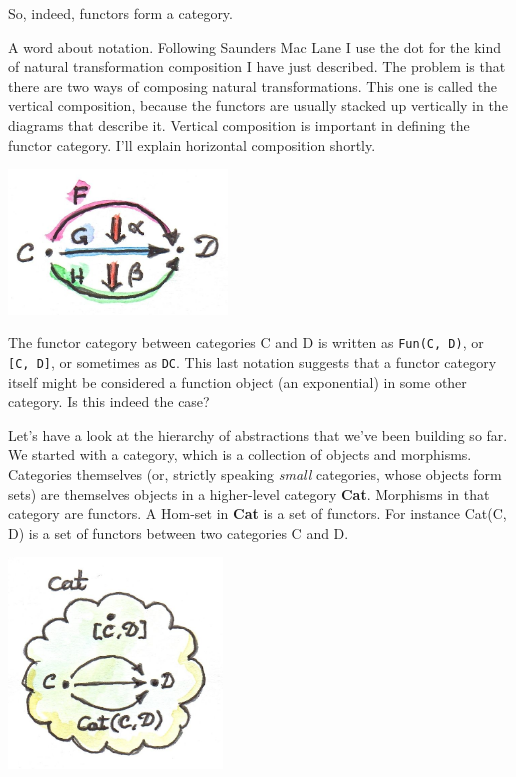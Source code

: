 So, indeed, functors form a category.

A word about notation. Following Saunders Mac Lane I use the dot for the
kind of natural transformation composition I have just described. The
problem is that there are two ways of composing natural transformations.
This one is called the vertical composition, because the functors are
usually stacked up vertically in the diagrams that describe it. Vertical
composition is important in defining the functor category. I'll explain
horizontal composition shortly.

\includegraphics[width=2.29167in]{images/6a_vertical.jpg}

The functor category between categories C and D is written as
\texttt{Fun(C,\ D)}, or \texttt{{[}C,\ D{]}}, or sometimes as
\texttt{DC}. This last notation suggests that a functor category itself
might be considered a function object (an exponential) in some other
category. Is this indeed the case?

Let's have a look at the hierarchy of abstractions that we've been
building so far. We started with a category, which is a collection of
objects and morphisms. Categories themselves (or, strictly speaking
\emph{small} categories, whose objects form sets) are themselves objects
in a higher-level category \textbf{Cat}. Morphisms in that category are
functors. A Hom-set in \textbf{Cat} is a set of functors. For instance
Cat(C, D) is a set of functors between two categories C and D.

\includegraphics[width=2.23958in]{images/7_cathomset.jpg}

